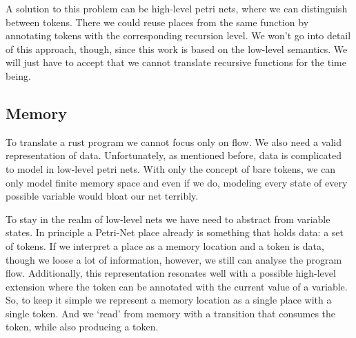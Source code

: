 A solution to this problem can be high-level petri nets, where we can distinguish between tokens.
There we could reuse places from the same function by annotating tokens with the corresponding recursion level.
We won't go into detail of this approach, though, since this work is based on the low-level semantics.
We will just have to accept that we cannot translate recursive functions for the time being.

\subsection{Memory}
To translate a rust program we cannot focus only on flow.
We also need a valid representation of data.
Unfortunately, as mentioned before, data is complicated to model in low-level petri nets.
With only the concept of bare tokens, we can only model finite memory space and even if we do, modeling every state of every possible variable would bloat our net terribly.

To stay in the realm of low-level nets we have need to abstract from variable states.
In principle a Petri-Net place already is something that holds data: a set of tokens.
If we interpret a place as a memory location and a token is data, though we loose a lot of information, however, we still can analyse the program flow.
Additionally, this representation resonates well with a possible high-level extension where the token can be annotated with the current value of a variable.
So, to keep it simple we represent a memory location as a single place with a single token.
And we `read' from memory with a transition that consumes the token, while also producing a token.


